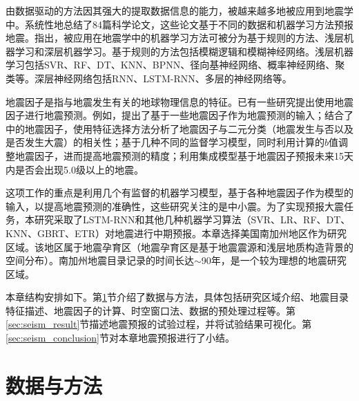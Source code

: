 由数据驱动的方法因其强大的提取数据信息的能力，被越来越多地被应用到地震学中\citep{Alves2006Earthquake,Panakkat2007Neural,Madahizadeh2009prediction,Sunkara2009Model}。\citet{al2020application}系统性地总结了84篇科学论文，这些论文基于不同的数据和机器学习方法预报地震。\citet{al2020application}指出，被应用在地震学中的机器学习方法可被分为基于规则的方法、浅层机器学习和深层机器学习。基于规则的方法包括模糊逻辑\citep{zhong2010prediction,zamani2013application,mirrashid2014earthquake}和模糊神经网络\citep{Lopez2019Evolutionary}。浅层机器学习包括SVR\citep{asencio2017temporal}、RF\citep{asim2017earthquake}、DT\citep{asencio2017temporal}、KNN\citep{Panakkat2007Neural,asencio2017temporal}、BPNN\citep{Panakkat2007Neural,Narayanakumar2016A}、径向基神经网络\citep{Alexandridis2014Large}、概率神经网络\citep{Adeli2009A}、聚类\citep{shodiq2018neural}等。深层神经网络包括RNN\citep{Panakkat2009Recurrent,asim2017earthquake}、LSTM-RNN\citep{Wang2017Earthquake,Bhatia2018EARTHQUAKE,berhich2020lstm}、多层的神经网络\citep{huang2018large}等。

地震因子是指与地震发生有关的地球物理信息的特征。已有一些研究提出使用地震因子进行地震预测\citep{Panakkat2007Neural,martinez2013determining,reyes2013neural,morales2013earthquake,asencio2016sensitivity}。例如，\citet{reyes2013neural}提出了基于一些地震因子作为地震预测的输入；\citet{martinez2013determining}结合了\citet{Panakkat2007Neural}中的地震因子，使用特征选择方法分析了地震因子与二元分类（地震发生与否以及是否发生大震）的相关性；\citet{asencio2016sensitivity}基于几种不同的监督学习模型，同时利用计算的$b$值调整地震因子，进而提高地震预测的精度；\citet{asim2018seismic}利用集成模型基于地震因子预报未来15天内是否会出现5.0级以上的地震。

这项工作的重点是利用几个有监督的机器学习模型，基于各种地震因子作为模型的输入，以提高地震预测的准确性，这些研究关注的是中小震。为了实现预报大震任务，本研究采取了LSTM-RNN\citep{Wang2017Earthquake,Bhatia2018EARTHQUAKE,berhich2020lstm}和其他几种机器学习算法（SVR、LR、RF、DT、KNN、GBRT、ETR）对地震进行中期预报。本章选择美国南加州地区作为研究区域。该地区属于地震孕育区（地震孕育区是基于地震震源和浅层地质构造背景的空间分布）。南加州地震目录记录的时间长达$\sim$90年，是一个较为理想的地震研究区域。

本章结构安排如下。第\ref{sec:seism_data_method}节介绍了数据与方法，具体包括研究区域介绍、地震目录特征描述、地震因子的计算、时空窗口法、数据的预处理过程等。第\ref{sec:seism_result}节描述地震预报的试验过程，并将试验结果可视化。第\ref{sec:seism_conclusion}节对本章地震预报进行了小结。

\section{数据与方法}\label{sec:seism_data_method}

